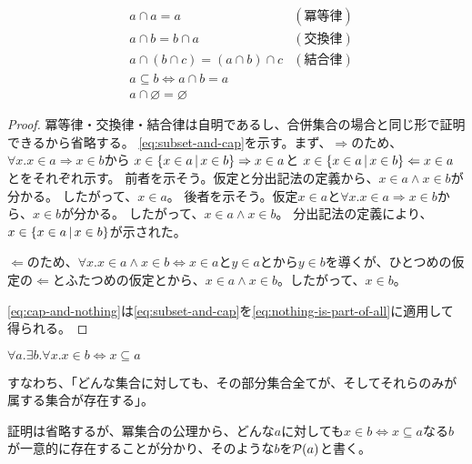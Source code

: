 \documentclass[uplatex,papersize,dvipdfmx]{jsarticle}
\begin{document}
    \begin{theorem}
      \begin{align}
        &a \cap a = a &(冪等律)\\
        &a \cap b = b \cap a &(交換律)\\
        &a \cap (b \cap c) = (a \cap b) \cap c &(結合律)\\
        &a \subseteq b \Leftrightarrow a \cap b = a \label{eq:subset-and-cap}\\
        &a \cap \varnothing = \varnothing \label{eq:cap-and-nothing}
      \end{align}
      \begin{proof}
        冪等律・交換律・結合律は自明であるし、合併集合の場合と同じ形で証明できるから省略する。
        \eqref{eq:subset-and-cap}を示す。まず、$\Rightarrow$のため、$\forall x. x \in a \Rightarrow x \in b$から
        $x \in \{ x \in a \, | \, x \in b \} \Rightarrow x \in a$と
        $x \in \{ x \in a \, | \, x \in b \} \Leftarrow x \in a$
        とをそれぞれ示す。
        前者を示そう。仮定と分出記法の定義から、$x \in a \land x \in b$が分かる。
        したがって、$x \in a$。
        後者を示そう。仮定$x \in a$と$\forall x. x \in a \Rightarrow x \in b$から、$x \in b$が分かる。
        したがって、$x \in a \land x \in b$。
        分出記法の定義により、$x \in \{ x \in a \, | \, x \in b \}$が示された。

        $\Leftarrow$のため、$\forall x. x \in a \land x \in b \Leftrightarrow x \in a$と$y \in a$とから$y \in b$を導くが、ひとつめの仮定の$\Leftarrow$とふたつめの仮定とから、$x \in a \land x \in b$。したがって、$x \in b$。

        \eqref{eq:cap-and-nothing}は\eqref{eq:subset-and-cap}を\eqref{eq:nothing-is-part-of-all}に適用して得られる。
      \end{proof}
    \end{theorem}
    \begin{axiom}[冪集合の公理]
      $\forall a. \exists b. \forall x. x \in b \Leftrightarrow x \subseteq a$
      \begin{note}
        すなわち、「どんな集合に対しても、その部分集合全てが、そしてそれらのみが属する集合が存在する」。
      \end{note}
    \end{axiom}
    \begin{definition}[冪集合]
      証明は省略するが、冪集合の公理から、どんな$a$に対しても$x \in b \Leftrightarrow x \subseteq a$なる$b$が一意的に存在することが分かり、そのような$b$を$\mathcal{P}(a)$と書く。
    \end{definition}
\end{document}
